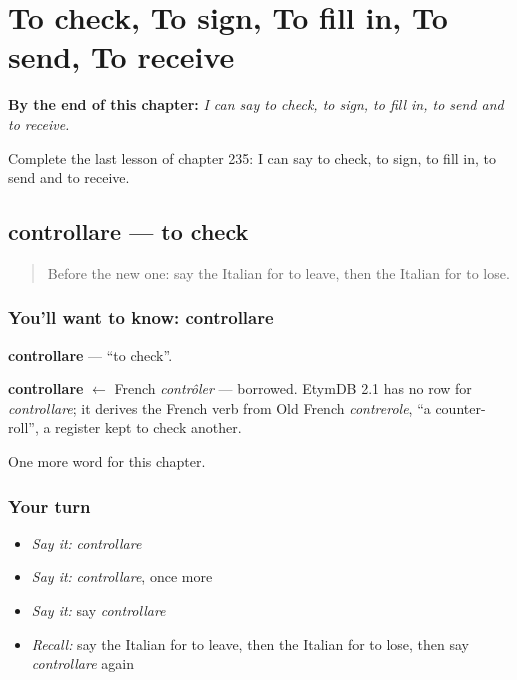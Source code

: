 
\chapter{To check, To sign, To fill in, To send, To receive}
\label{ch:it-to-check-to-sign-to-fill-in-to-send-to-receive}

\begin{chapteropening}
\textbf{By the end of this chapter:} \emph{I can say to check, to sign, to fill in, to send and to receive.}

Complete the last lesson of chapter 235: I can say to check, to sign, to fill in, to send and to receive.
\end{chapteropening}

\section[controllare]{controllare — to check}

\label{lesson:IT-C235-controllare}



\begin{quote}
Before the new one: say the Italian for to leave, then the Italian for to lose.
\end{quote}

\subsection*{You'll want to know: controllare}
\textbf{controllare} — \textquotedblleft{}to check\textquotedblright{}.

\begin{cousinweb}
\textbf{controllare} $\leftarrow$ French \emph{contrôler} — borrowed. EtymDB 2.1 has no row for \emph{controllare}; it derives the French verb from Old French \emph{contrerole}, \textquotedblleft{}a counter-roll\textquotedblright{}, a register kept to check another.
\end{cousinweb}

\begin{grammarlens}[title={What you've built}]
One more word for this chapter.
\end{grammarlens}

\subsection*{Your turn}
\begin{itemize}
\raggedright
  \item \emph{Say it:} \emph{controllare}
  \item \emph{Say it:} \emph{controllare}, once more
  \item \emph{Say it:} say \emph{controllare}
  \item \emph{Recall:} say the Italian for to leave, then the Italian for to lose, then say \emph{controllare} again
\end{itemize}

